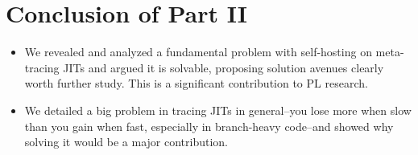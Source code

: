 \chapter{Conclusion of Part II}

	\begin{mainpoint}

		\begin{itemize}
			\item We revealed and analyzed a fundamental problem with self-hosting on meta-tracing JITs and argued it is solvable, proposing solution avenues clearly worth further study.  This is a significant contribution to PL research.
			\item We detailed a big problem in tracing JITs in general--you lose more when slow than you gain when fast, especially in branch-heavy code--and showed why solving it would be a major contribution.
		\end{itemize}
		
	\end{mainpoint}